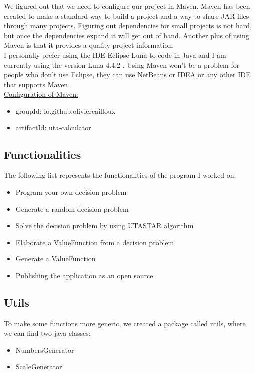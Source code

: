 \documentclass{report}
\begin{document}
We figured out that we need to configure our project in Maven. Maven has been created to make a standard way to build a project and a way to share JAR files through many projects. Figuring out dependencies for small projects is not hard, but once the dependencies expand it will get out of hand. Another plus of using Maven is that it provides a quality project information.\\

I personally prefer using the IDE Eclipse Luna to code in Java and I am currently using the version Luna 4.4.2 . Using Maven  won't be a problem for people who don't use Eclipse, they can use NetBeans or IDEA or any other IDE that supports Maven. \\

\underline{Configuration of Maven: }
\begin{itemize}
\item groupId: io.github.oliviercailloux
\item artifactId: uta-calculator
\end{itemize}

\subsection{Functionalities}
The following list represents the functionalities of the program I worked on:
\begin{itemize}
\item Program your own decision problem
\item Generate a random decision problem
\item Solve the decision problem by using UTASTAR algorithm
\item Elaborate a ValueFunction from a decision problem
\item Generate a ValueFunction
\item Publishing the application as an open source
\end{itemize}
\subsection{Utils}
To make some functions more generic, we created a package called utils, where we can find two java classes: 
\begin{itemize}
\item NumbersGenerator
\item ScaleGenerator
\end{itemize}
\end{document}

